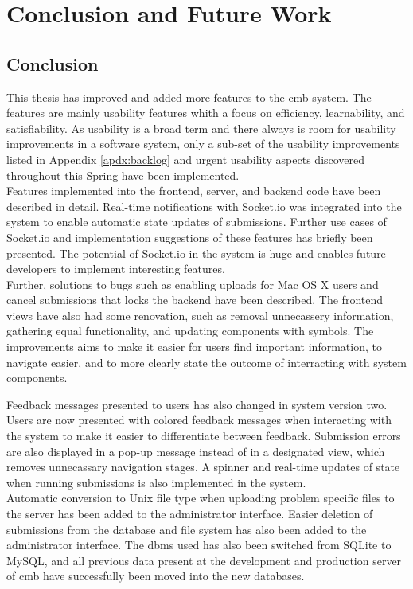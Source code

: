 \chapter{Conclusion and Future Work}
\label{ch:conclusion}

\section{Conclusion}
This thesis has improved and added more features to the \gls{cmb} system. The features are mainly usability features whith a focus on efficiency, learnability, and satisfiability. As usability is a broad term and there always is room for usability improvements in a software system, only a sub-set of the usability improvements listed in Appendix \ref{apdx:backlog} and urgent usability aspects discovered throughout this Spring have been implemented. \\

Features implemented into the frontend, server, and backend code have been described in detail. Real-time notifications with Socket.io was integrated into the system to enable automatic state updates of submissions.  Further use cases of Socket.io and implementation suggestions of these features has briefly been presented. The potential of Socket.io in the system is huge and enables future developers to implement interesting features. \\

Further, solutions to bugs such as enabling uploads for Mac OS X users and cancel submissions that locks the backend have been described. The frontend views have also had some renovation, such as removal unnecassery information, gathering equal functionality, and updating components with symbols. The improvements aims to make it easier for users find important information, to navigate easier, and to more clearly state the outcome of interracting with system components.

Feedback messages presented to users has also changed in system version two. Users are now presented with colored feedback messages when interacting with the system to make it easier to differentiate between feedback. Submission errors are also displayed in a pop-up message instead of in a designated view, which removes unnecassary navigation stages. A spinner and real-time updates of state when running submissions is also implemented in the system. \\

Automatic conversion to Unix file type when uploading problem specific files to the server has been added to the administrator interface. Easier deletion of submissions from the database and file system has also been added to the administrator interface. The \gls{dbms} used has also been switched from SQLite to MySQL, and all previous data present at the development and production server of \gls{cmb} have successfully been moved into the new databases. \\


